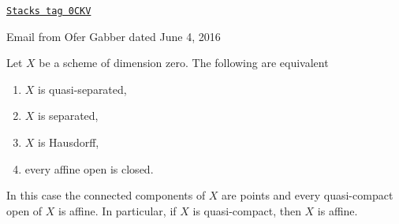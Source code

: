 \begin{lemma}
\label{properties-lemma-dimension-zero}
\href{https://stacks.math.columbia.edu/tag/0CKV}{\texttt{Stacks tag 0CKV}}

\begin{reference}
Email from Ofer Gabber dated June 4, 2016
\end{reference}
Let $X$ be a scheme of dimension zero. The following are equivalent
\begin{enumerate}
\item $X$ is quasi-separated,
\item $X$ is separated,
\item $X$ is Hausdorff,
\item every affine open is closed.
\end{enumerate}
In this case the connected components of $X$ are points and every
quasi-compact open of $X$ is affine. In particular, if $X$
is quasi-compact, then $X$ is affine.
\end{lemma}

